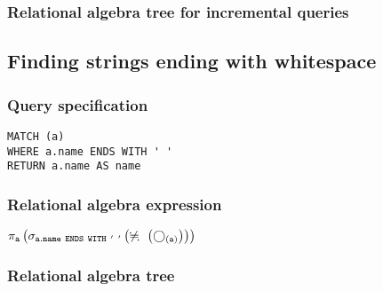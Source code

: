 \subsubsection*{Relational algebra tree for incremental queries}


\subsection{Finding strings ending with whitespace}

\subsubsection*{Query specification}

\begin{lstlisting}
MATCH (a)
WHERE a.name ENDS WITH ' '
RETURN a.name AS name
\end{lstlisting}

\subsubsection*{Relational algebra expression}

$\projection{\var{a}} \left(\selection{\mathtt{a.name~ENDS~WITH~'~'}} \left(\alldifferent{} \left(\getvertices{a}{}\right)\right)\right)$

\subsubsection*{Relational algebra tree}


